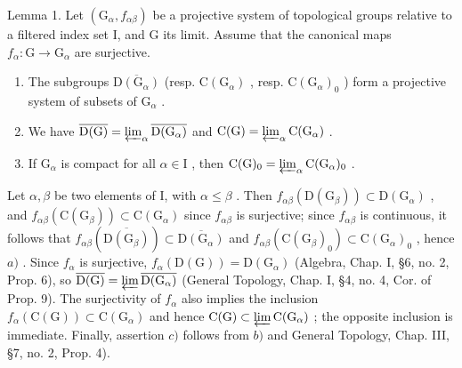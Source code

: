 
Lemma 1. Let \((\mathrm{G}_{\alpha}, f_{\alpha \beta})\) be a projective system of topological groups relative to a filtered index set I, and G its limit. Assume that the canonical maps \(f_{\alpha}: \mathrm{G} \to \mathrm{G}_{\alpha}\) are surjective.

\begin{enumerate}
\def\labelenumi{\alph{enumi})}
\item
  The subgroups \(\overline{\mathrm{D}(\mathrm{G}_{\alpha})}\) (resp. \(\mathrm{C}(\mathrm{G}_{\alpha})\) , resp. \(\mathrm{C}(\mathrm{G}_{\alpha})_0\) ) form a projective system of subsets of \(\mathrm{G}_{\alpha}\) .
\item
  We have \(\overline{\mathrm{D}(\mathrm{G})}=\varprojlim_{\alpha}\overline{\mathrm{D}(\mathrm{G}_{\alpha})}\) and \(\mathrm{C}(\mathrm{G})=\varprojlim_{\alpha}\mathrm{C}(\mathrm{G}_{\alpha})\) .
\item
  If \(\mathrm{G}_{\alpha}\) is compact for all \(\alpha \in \mathrm{I}\) , then \(\mathrm{C}(\mathrm{G})_0 = \varprojlim_{\alpha} \mathrm{C}(\mathrm{G}_{\alpha})_0\) .
\end{enumerate}

Let \(\alpha, \beta\) be two elements of I, with \(\alpha \leq \beta\) . Then \(f_{\alpha \beta}(\mathrm{D}(\mathrm{G}_{\beta})) \subset \mathrm{D}(\mathrm{G}_{\alpha})\) , and \(f_{\alpha \beta}(\mathrm{C}(\mathrm{G}_{\beta})) \subset \mathrm{C}(\mathrm{G}_{\alpha})\) since \(f_{\alpha \beta}\) is surjective; since \(f_{\alpha \beta}\) is continuous, it follows that \(f_{\alpha \beta}(\overline{\mathrm{D}(\mathrm{G}_{\beta})}) \subset \overline{\mathrm{D}(\mathrm{G}_{\alpha})}\) and \(f_{\alpha \beta}(\mathrm{C}(\mathrm{G}_{\beta})_0) \subset \mathrm{C}(\mathrm{G}_{\alpha})_0\) , hence \(a)\) . Since \(f_{\alpha}\) is surjective, \(f_{\alpha}(\mathrm{D}(\mathrm{G})) = \mathrm{D}(\mathrm{G}_{\alpha})\) (Algebra, Chap. I, §6, no. 2, Prop. 6), so \(\overline{\mathrm{D}(\mathrm{G})} = \varprojlim \overline{\mathrm{D}(\mathrm{G}_{\alpha})}\) (General Topology, Chap. I, §4, no. 4, Cor. of Prop. 9). The surjectivity of \(f_{\alpha}\) also implies the inclusion \(f_{\alpha}(\mathrm{C}(\mathrm{G})) \subset \mathrm{C}(\mathrm{G}_{\alpha})\) and hence \(\mathrm{C}(\mathrm{G}) \subset \varprojlim \mathrm{C}(\mathrm{G}_{\alpha})\) ; the opposite inclusion is immediate. Finally, assertion \(c)\) follows from \(b)\) and General Topology, Chap. III, §7, no. 2, Prop. 4).

